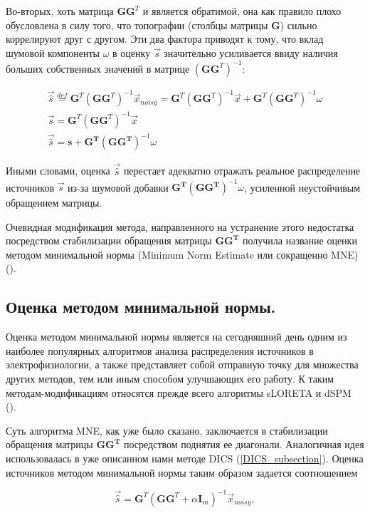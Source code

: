 Во-вторых, хоть матрица $\mathbf{G}\mathbf{G}^T$ и является обратимой, она как
правило плохо обусловлена в силу того, что топографии (столбцы матрицы
$\mathbf{G}$) сильно коррелируют друг с другом.  Эти два фактора
приводят к тому, что вклад шумовой компоненты $\omega$ в оценку $\vec{s}$
значительно усиливается ввиду наличия больших собственных значений в матрице
${(\mathbf{G}\mathbf{G}^T)}^{-1}$:

\begin{gather*}
    \vec{\hat{s}} \stackrel{def}{=} \mathbf{G}^T{(\mathbf{G}\mathbf{G}^T)}^{-1}\vec{x}_{noisy} = 
    \mathbf{G}^T{(\mathbf{G}\mathbf{G}^T)}^{-1}\vec{x} +
    \mathbf{G}^T{(\mathbf{G}\mathbf{G}^T)}^{-1}\omega\\
    \vec{s} = \mathbf{G}^T{(\mathbf{G}\mathbf{G}^T)}^{-1}\vec{x}
    \\
    \vec{\hat{s}} =  \mathbf{s + G^T{(GG^T)}}^{-1}\omega
\end{gather*}

Иными словами, оценка $\vec{\hat{s}}$ перестает адекватно отражать реальное распределение
источников $\vec{s}$ из-за шумовой добавки $\mathbf{G^T{(GG^T)}}^{-1}\omega$, усиленной
неустойчивым обращением матрицы.

Очевидная модификация метода, направленного на устранение этого недостатка
посредством стабилизации обращения матрицы $\mathbf{GG^T}$ получила название
оценки методом минимальной нормы (Minimum Norm Estimate или сокращенно MNE)
(\cite{MNE_paper}).

\subsection{Оценка методом минимальной нормы.}

Оценка методом минимальной нормы является на сегодняшний день одним из наиболее
популярных алгоритмов анализа распределения источников в электрофизиологии, а
также представляет собой отправную точку для множества других методов, тем или
иным способом улучшающих его работу. К таким методам-модификациям относятся
прежде всего алгоритмы sLORETA и dSPM (\cite{sLORETA_paper, dSPM_paper}).

Суть алгоритма MNE, как уже было сказано, заключается в стабилизации обращения
матрицы $\mathbf{GG^T}$ посредством поднятия ее диагонали. Аналогичная идея
использовалась в уже описанном нами методе DICS (\ref{DICS_subsection}).
Оценка источников методом минимальной нормы таким образом задается соотношением

\begin{equation}
    \vec{\hat{s}} = \mathbf{G}^T(\mathbf{GG}^T + \alpha \mathbf{I}_m)^{-1}\vec{x}_{noisy},
    \label{MNE_estimation_formula}
\end{equation}

